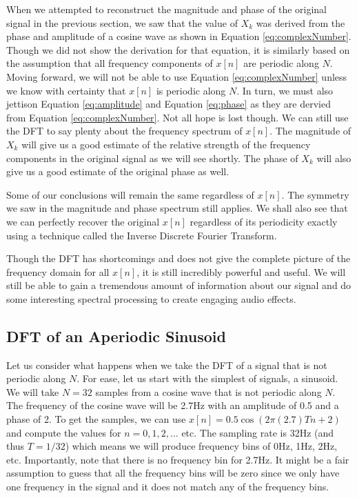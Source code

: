 When we attempted to reconstruct the magnitude and phase of the original signal in the previous section,
we saw that the value of $X_k$ was derived from the phase and amplitude of a cosine wave as shown in
Equation \ref{eq:complexNumber}.  Though we did not show the derivation for that equation, it is similarly
based on the assumption that all frequency components of $x[n]$ are periodic along $N$.  Moving forward,
we will not be able to use Equation \ref{eq:complexNumber} unless we know with certainty that $x[n]$ is 
periodic along $N$.  In turn, we must also jettison Equation \ref{eq:amplitude} and 
Equation \ref{eq:phase} as they are dervied from Equation \ref{eq:complexNumber}.  Not all hope is lost
though.  We can still use the DFT to say plenty about the frequency spectrum of $x[n]$.  The magnitude of 
$X_k$ will give us a good estimate of the relative strength of the frequency components in the original 
signal as we will see shortly.  The phase of $X_k$ will also give us a good estimate of the original phase 
as well.  

Some of our conclusions will remain the same regardless of $x[n]$.  The symmetry we saw in the magnitude
and phase spectrum still applies.  We shall also see that we can perfectly recover the original $x[n]$ regardless
of its periodicity exactly using a technique called the Inverse Discrete Fourier Transform.

Though the DFT has shortcomings and does not give the complete picture of the frequency domain for
all $x[n]$, it is still incredibly powerful and useful.  We will still be able to gain a tremendous amount of
information about our signal and do some interesting spectral processing to create engaging audio effects.

\subsection*{DFT of an Aperiodic Sinusoid}

Let us consider what happens when we take the DFT of a signal that is not periodic along $N$.  For ease, let us
start with the simplest of signals, a sinusoid.  We will take $N = 32$ samples from a cosine wave 
that is not periodic along $N$.  The frequency of the cosine wave will be 2.7Hz with an amplitude of 0.5 and a phase of
2.  To get the samples, we can use $x[n] = 0.5\cos(2\pi (2.7)Tn + 2)$ and compute the values for 
$n = 0, 1, 2,...$ etc.
The sampling rate is 32Hz (and thus $T = 1/32$) 
which means we will produce frequency bins of 0Hz, 1Hz, 2Hz, etc.  Importantly, note that there is no frequency bin 
for 2.7Hz.  It might be a fair assumption to guess that all the frequency bins will be zero since we only have one
frequency in the signal and it does not match any of the frequency bins.

